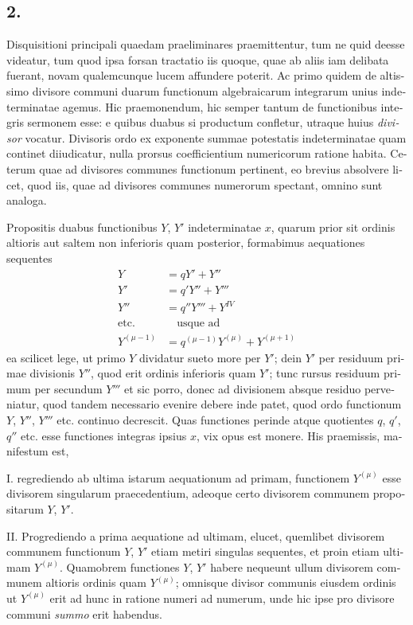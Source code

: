 \documentclass[12pt,a4paper]{article}
\begin{document}
\begin{otherlanguage}{latin}
\subsection*{2.}
Disquisitioni principali quaedam praeliminares praemittentur, tum ne quid deesse videatur, tum quod ipsa forsan tractatio iis quoque, quae ab aliis iam delibata fuerant, novam qualemcunque lucem affundere poterit. Ac primo quidem de altissimo divisore communi duarum functionum algebraicarum integrarum unius indeterminatae agemus. Hic praemonendum, hic semper tantum de functionibus integris sermonem esse: e quibus duabus si productum confletur, utraque huius \textit{divisor} vocatur. Divisoris ordo ex exponente summae potestatis indeterminatae quam continet diiudicatur, nulla prorsus coefficientium numericorum ratione habita. Ceterum quae ad divisores communes functionum pertinent, eo brevius absolvere licet, quod iis, quae ad divisores communes numerorum spectant, omnino sunt analoga.

Propositis duabus functionibus $Y$, $Y'$ indeterminatae $x$, quarum prior sit ordinis altioris aut saltem non inferioris quam posterior, formabimus aequationes sequentes
\begin{align*}
Y &= qY'+Y''\\
Y' &= q'Y''+Y'''\\
Y'' &= q''Y'''+Y^{IV}\\
\text{etc.}&\quad\text{usque ad}\\
Y^{(\mu-1)} &= q^{(\mu-1)}Y^{(\mu)}+Y^{(\mu+1)}
\end{align*}
ea scilicet lege, ut primo $Y$ dividatur sueto more per $Y'$; dein $Y'$ per residuum primae divisionis $Y''$, quod erit ordinis inferioris quam $Y'$; tunc rursus residuum primum per secundum $Y'''$ et sic porro, donec ad divisionem absque residuo perveniatur, quod tandem necessario evenire debere inde patet, quod ordo functionum $Y$, $Y''$, $Y'''$ etc. continuo decrescit. Quas functiones perinde atque quotientes $q$, $q'$, $q''$ etc. esse functiones integras ipsius $x$, vix opus est monere. His praemissis, manifestum est,

I. regrediendo ab ultima istarum aequationum ad primam, functionem $Y^{(\mu)}$ esse divisorem singularum praecedentium, adeoque certo divisorem communem propositarum $Y$, $Y'$.

II. Progrediendo a prima aequatione ad ultimam, elucet, quemlibet divisorem communem functionum $Y$, $Y'$ etiam metiri singulas sequentes, et proin etiam ultimam $Y^{(\mu)}$. Quamobrem functiones $Y$, $Y'$ habere nequeunt ullum divisorem communem altioris ordinis quam $Y^{(\mu)}$; omnisque divisor communis eiusdem ordinis ut $Y^{(\mu)}$ erit ad hunc in ratione numeri ad numerum, unde hic ipse pro divisore communi \textit{summo} erit habendus.


\end{otherlanguage}
\end{document}
